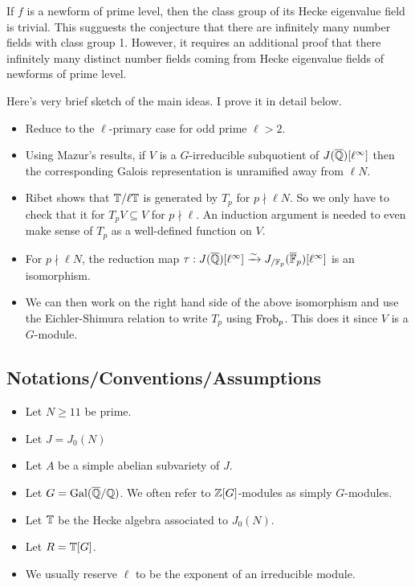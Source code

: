 \documentclass{article}
\begin{document}
\begin{conjecture}\label{conjecture:class_group_trivial}
    If $f$ is a newform of prime level, then the class group of its Hecke
    eigenvalue field is trivial. This sugguests the conjecture that there are
    infinitely many number fields with class group 1. However, it requires an
    additional proof that there infinitely many distinct number fields coming
    from Hecke eigenvalue fields of newforms of prime level.
\end{conjecture}

Here's very brief sketch of the main ideas. I prove it in detail below.
\begin{itemize}
    \item
        Reduce to the $\ell$-primary case for odd prime $\ell>2$.
    \item
        Using Mazur's results, if $V$ is a $G$-irreducible subquotient of
        $J(\overline{\mathbb{Q}})[\ell^\infty]$ then the corresponding Galois representation
        is unramified away from $\ell N$.
    \item
        Ribet shows that $\mathbb{T}/\ell \mathbb{T}$ is generated by $T_p$ for $p\nmid \ell
        N$. So we only have to check that it for $T_p V\subseteq V$ for
        $p\nmid \ell$. An induction argument is needed to even make sense of
        $T_p$ as a well-defined function on $V$.
    \item
        For $p\nmid \ell N$, the reduction map
        $\tau:J(\overline{\mathbb{Q}})[\ell^\infty]\xrightarrow{\sim} J_{/\mathbb{F}_p}(\overline{\mathbb{F}}_p)[\ell^\infty]$ is an
        isomorphism.
    \item
        We can then work on the right hand side of the above isomorphism and
        use the Eichler-Shimura relation to write $T_p$ using $\operatorname{Frob}_p$. This
        does it since $V$ is a $G$-module.
\end{itemize}


\subsection{Notations/Conventions/Assumptions}

\begin{itemize}
    \item
        Let $N\geq 11$ be prime.
    \item
        Let $J=J_0(N)$
    \item
        Let $A$ be a simple abelian subvariety of $J$.
    \item
        Let $G=\operatorname{Gal}(\overline{\mathbb{Q}}/\mathbb{Q})$. We often refer to $\mathbb{Z}[G]$-modules as simply
        $G$-modules.
    \item
        Let $\mathbb{T}$ be the Hecke algebra associated to $J_0(N)$.
    \item
        Let $R=\mathbb{T}[G]$.
    \item
        We usually reserve $\ell$ to be the exponent of an irreducible module.
\end{itemize}
\end{document}
